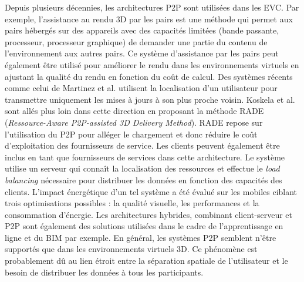 Depuis plusieurs décennies, les architectures \gls{P2P} sont utilisées dans les 
\gls{EVC}. Par exemple, l'assistance au rendu \gls{3D} par les pairs \cite{Zhu2011}
est une méthode qui permet aux pairs hébergés sur des appareils avec des capacités 
limitées (bande passante, processeur, processeur graphique) de demander une 
partie du contenu de l'environnement aux autres pairs.
Ce système d'assistance par les pairs peut également être utilisé pour améliorer le 
rendu dans les environnements virtuels en ajustant la qualité du rendu en fonction 
du coût de calcul. 
Des systèmes récents comme celui de Martinez et al. \cite{Martinez2009} 
utilisent la localisation d'un utilisateur pour transmettre uniquement les mises 
à jours à son plus proche voisin.  
Koskela et al. \cite{Koskela2014} sont allés plus loin dans cette direction en 
proposant la méthode RADE (\textit{Ressource-Aware P2P-assisted 3D Delivery 
Method}). RADE repose sur l'utilisation du \gls{P2P} pour alléger le chargement 
et donc réduire le coût d'exploitation des fournisseurs de service. Les 
clients peuvent également être inclus en tant que fournisseurs de services dans 
cette architecture. 
Le système utilise un serveur qui connaît la localisation des ressources et 
effectue le \textit{load balancing} nécessaire pour distribuer les données en 
fonction des capacités des clients. L'impact énergétique d'un tel système a été 
évalué sur les mobiles ciblant trois optimisations possibles : la qualité visuelle, les 
performances et la consommation d'énergie. 
Les architectures hybrides, combinant client-serveur et \gls{P2P} sont également 
des solutions utilisées dans le cadre de l'apprentissage en ligne 
\cite{Ekadiyanto2012} et du BIM \cite{Chen2014} par exemple. 
En général, les systèmes \gls{P2P} semblent n'être supportés que dans les 
environnements virtuels \gls{3D}. Ce phénomène est probablement dû au lien étroit 
entre la séparation spatiale de l'utilisateur et le besoin de distribuer les données à 
tous les participants.
%
%

